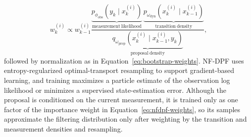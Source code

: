 \begin{equation}\label{eq:nfdpf-weights}
 w_k^{(i)}\propto w_{k-1}^{(i)}
 \frac{\underbrace{p_{\phi_{\mathrm{obs}}}(y_k\mid x_k^{(i)})}_{\mathrm{measurement\ likelihood}}\,
 \underbrace{p_{\omega_{\mathrm{dyn}}}(x_k^{(i)}\mid x_{k-1}^{(i)})}_{\mathrm{transition\ density}}}
 {\underbrace{q_{\omega_{\mathrm{prop}}}(x_k^{(i)}\mid x_{k-1}^{(i)},y_k)}_{\mathrm{proposal\ density}}},
\end{equation}
followed by normalization as in Equation~\eqref{eq:bootstrap-weights}. NF-DPF uses entropy-regularized optimal-transport resampling to support gradient-based learning, and training maximizes a particle estimate of the observation log likelihood or minimizes a supervised state-estimation error. Although the proposal is conditioned on the current measurement, it is trained only as one factor of the importance weight in Equation~\eqref{eq:nfdpf-weights}, so its samples approximate the filtering distribution only after weighting by the transition and measurement densities and resampling. 

